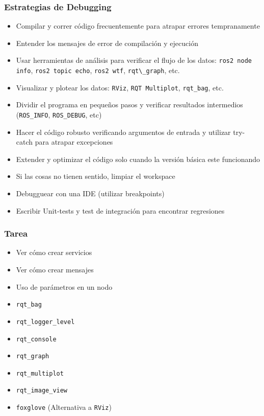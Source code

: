 \begin{frame}
    \frametitle{Estrategias de Debugging}
    
    \begin{itemize}
        \item Compilar y correr código frecuentemente para atrapar errores tempranamente
        \item Entender los mensajes de error de compilación y ejecución
        \item Usar herramientas de análisis para verificar el flujo de los datos: \lstinline[style=bash]{ros2 node info}, \lstinline[style=bash]{ros2 topic echo}, \lstinline[style=bash]{ros2 wtf}, \lstinline[style=bash]{rqt\_graph}, etc.
        \item Visualizar y plotear los datos: \lstinline[style=bash]{RViz}, \lstinline[style=bash]{RQT Multiplot}, \lstinline[style=bash]{rqt_bag}, etc.
        \item Dividir el programa en pequeños pasos y verificar resultados intermedios (\lstinline[style=bash]{ROS_INFO}, \lstinline[style=bash]{ROS_DEBUG}, etc)
        \item Hacer el código robusto verificando argumentos de entrada y utilizar try-catch para atrapar excepciones
        \item Extender y optimizar el código solo cuando la versión básica este funcionando
        \item Si las cosas no tienen sentido, limpiar el workspace
        \item Debugguear con una IDE (utilizar breakpoints)
        \item Escribir Unit-tests y test de integración para encontrar regresiones
    \end{itemize}
    
\end{frame}

\begin{frame}
	\frametitle{Tarea}
	
	\begin{itemize}
		\item Ver cómo crear servicios
		\item Ver cómo crear mensajes
		\item Uso de parámetros en un nodo
        \item \lstinline[style=bash]{rqt_bag}
		\item \lstinline[style=bash]{rqt_logger_level}
		\item \lstinline[style=bash]{rqt_console}
		\item \lstinline[style=bash]{rqt_graph}
		\item \lstinline[style=bash]{rqt_multiplot}
		\item \lstinline[style=bash]{rqt_image_view}
        \item \lstinline[style=bash]{foxglove} (Alternativa a \lstinline[style=bash]{RViz})
	\end{itemize}
	
\end{frame}


